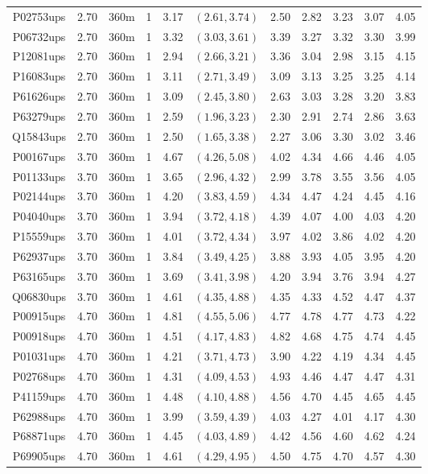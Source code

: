 \begin{landscape}
\begin{longtable}{cccc|cc|ccccc}
  P02753ups & 2.70 & 360m &   1 & 3.17 & $(2.61, 3.74)$ & 2.50 & 2.82 & 3.23 & 3.07 & 4.05 \\ 
  P06732ups & 2.70 & 360m &   1 & 3.32 & $(3.03, 3.61)$ & 3.39 & 3.27 & 3.32 & 3.30 & 3.99 \\ 
  P12081ups & 2.70 & 360m &   1 & 2.94 & $(2.66, 3.21)$ & 3.36 & 3.04 & 2.98 & 3.15 & 4.15 \\ 
  P16083ups & 2.70 & 360m &   1 & 3.11 & $(2.71, 3.49)$ & 3.09 & 3.13 & 3.25 & 3.25 & 4.14 \\ 
  P61626ups & 2.70 & 360m &   1 & 3.09 & $(2.45, 3.80)$ & 2.63 & 3.03 & 3.28 & 3.20 & 3.83 \\ 
  P63279ups & 2.70 & 360m &   1 & 2.59 & $(1.96, 3.23)$ & 2.30 & 2.91 & 2.74 & 2.86 & 3.63 \\ 
  Q15843ups & 2.70 & 360m &   1 & 2.50 & $(1.65, 3.38)$ & 2.27 & 3.06 & 3.30 & 3.02 & 3.46 \\ 
  P00167ups & 3.70 & 360m &   1 & 4.67 & $(4.26, 5.08)$ & 4.02 & 4.34 & 4.66 & 4.46 & 4.05 \\ 
  P01133ups & 3.70 & 360m &   1 & 3.65 & $(2.96, 4.32)$ & 2.99 & 3.78 & 3.55 & 3.56 & 4.05 \\ 
  P02144ups & 3.70 & 360m &   1 & 4.20 & $(3.83, 4.59)$ & 4.34 & 4.47 & 4.24 & 4.45 & 4.16 \\ 
  P04040ups & 3.70 & 360m &   1 & 3.94 & $(3.72, 4.18)$ & 4.39 & 4.07 & 4.00 & 4.03 & 4.20 \\ 
  P15559ups & 3.70 & 360m &   1 & 4.01 & $(3.72, 4.34)$ & 3.97 & 4.02 & 3.86 & 4.02 & 4.20 \\ 
  P62937ups & 3.70 & 360m &   1 & 3.84 & $(3.49, 4.25)$ & 3.88 & 3.93 & 4.05 & 3.95 & 4.20 \\ 
  P63165ups & 3.70 & 360m &   1 & 3.69 & $(3.41, 3.98)$ & 4.20 & 3.94 & 3.76 & 3.94 & 4.27 \\ 
  Q06830ups & 3.70 & 360m &   1 & 4.61 & $(4.35, 4.88)$ & 4.35 & 4.33 & 4.52 & 4.47 & 4.37 \\ 
  P00915ups & 4.70 & 360m &   1 & 4.81 & $(4.55, 5.06)$ & 4.77 & 4.78 & 4.77 & 4.73 & 4.22 \\ 
  P00918ups & 4.70 & 360m &   1 & 4.51 & $(4.17, 4.83)$ & 4.82 & 4.68 & 4.75 & 4.74 & 4.45 \\ 
  P01031ups & 4.70 & 360m &   1 & 4.21 & $(3.71, 4.73)$ & 3.90 & 4.22 & 4.19 & 4.34 & 4.45 \\ 
  P02768ups & 4.70 & 360m &   1 & 4.31 & $(4.09, 4.53)$ & 4.93 & 4.46 & 4.47 & 4.47 & 4.31 \\ 
  P41159ups & 4.70 & 360m &   1 & 4.48 & $(4.10, 4.88)$ & 4.56 & 4.70 & 4.45 & 4.65 & 4.45 \\ 
  P62988ups & 4.70 & 360m &   1 & 3.99 & $(3.59, 4.39)$ & 4.03 & 4.27 & 4.01 & 4.17 & 4.30 \\ 
  P68871ups & 4.70 & 360m &   1 & 4.45 & $(4.03, 4.89)$ & 4.42 & 4.56 & 4.60 & 4.62 & 4.24 \\ 
  P69905ups & 4.70 & 360m &   1 & 4.61 & $(4.29, 4.95)$ & 4.50 & 4.75 & 4.70 & 4.57 & 4.30 \\ 
   \hline
\end{longtable}
\end{landscape}

